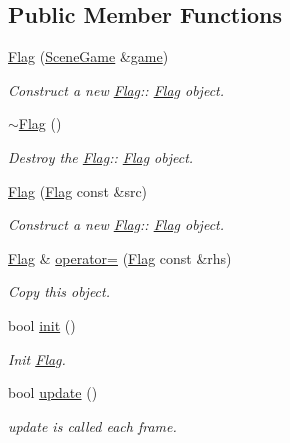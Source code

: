 \subsection*{Public Member Functions}
\begin{DoxyCompactItemize}
\item 
\hyperlink{class_flag_a0e6e8ac4f2fcd1ae0f98c17c68b4ecb1}{Flag} (\hyperlink{class_scene_game}{Scene\+Game} \&\hyperlink{class_a_entity_aa2c05db944a8b7487eb8470dd20211ab}{game})
\begin{DoxyCompactList}\small\item\em Construct a new \hyperlink{class_flag}{Flag}\+:\+: \hyperlink{class_flag}{Flag} object. \end{DoxyCompactList}\item 
\mbox{\label{class_flag_a0f8f181d049036f54b5609bc646e2960}} 
\hyperlink{class_flag_a0f8f181d049036f54b5609bc646e2960}{$\sim$\+Flag} ()
\begin{DoxyCompactList}\small\item\em Destroy the \hyperlink{class_flag}{Flag}\+:\+: \hyperlink{class_flag}{Flag} object. \end{DoxyCompactList}\item 
\hyperlink{class_flag_a23da423347ebdedd5772a1e683d8c0c7}{Flag} (\hyperlink{class_flag}{Flag} const \&src)
\begin{DoxyCompactList}\small\item\em Construct a new \hyperlink{class_flag}{Flag}\+:\+: \hyperlink{class_flag}{Flag} object. \end{DoxyCompactList}\item 
\hyperlink{class_flag}{Flag} \& \hyperlink{class_flag_a6834049fb149bb14e35a4f273937c419}{operator=} (\hyperlink{class_flag}{Flag} const \&rhs)
\begin{DoxyCompactList}\small\item\em Copy this object. \end{DoxyCompactList}\item 
bool \hyperlink{class_flag_abdb7a9ef47dd6ea6a24beec99b372f11}{init} ()
\begin{DoxyCompactList}\small\item\em Init \hyperlink{class_flag}{Flag}. \end{DoxyCompactList}\item 
bool \hyperlink{class_flag_adeaab6cd88bbc3284f8b4f1b2f78242b}{update} ()
\begin{DoxyCompactList}\small\item\em update is called each frame. \end{DoxyCompactList}\item 

\end{DoxyCompactItemize}
